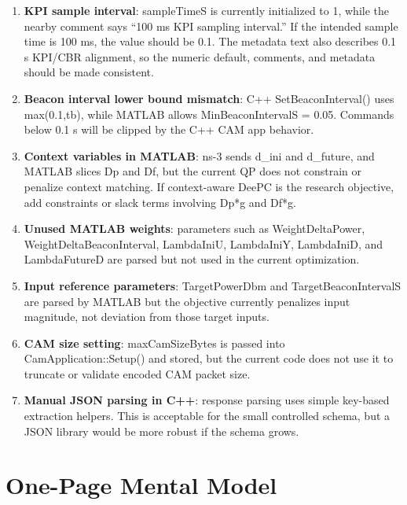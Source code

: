 \documentclass[11pt]{article}
\DeclareRobustCommand{\code}[1]{\texttt{\detokenize{#1}}}
\def\code#1{#1}%
\begin{document}
\begin{enumerate}
  \item \textbf{KPI sample interval}: \code{sampleTimeS} is currently initialized
  to \code{1}, while the nearby comment says ``100 ms KPI sampling interval.''  If
  the intended sample time is 100 ms, the value should be \code{0.1}.
  The metadata text also describes 0.1 s KPI/CBR alignment, so the numeric
  default, comments, and metadata should be made consistent.
  \item \textbf{Beacon interval lower bound mismatch}: C++ \code{SetBeaconInterval()}
  uses \code{max(0.1,tb)}, while MATLAB allows \code{MinBeaconIntervalS = 0.05}.
  Commands below 0.1 s will be clipped by the C++ CAM app behavior.
  \item \textbf{Context variables in MATLAB}: ns-3 sends \code{d_ini} and
  \code{d_future}, and MATLAB slices \code{Dp} and \code{Df}, but the current QP
  does not constrain or penalize context matching.  If context-aware DeePC is the
  research objective, add constraints or slack terms involving \code{Dp*g} and
  \code{Df*g}.
  \item \textbf{Unused MATLAB weights}: parameters such as \code{WeightDeltaPower},
  \code{WeightDeltaBeaconInterval}, \code{LambdaIniU}, \code{LambdaIniY},
  \code{LambdaIniD}, and \code{LambdaFutureD} are parsed but not used in the
  current optimization.
  \item \textbf{Input reference parameters}: \code{TargetPowerDbm} and
  \code{TargetBeaconIntervalS} are parsed by MATLAB but the objective currently
  penalizes input magnitude, not deviation from those target inputs.
  \item \textbf{CAM size setting}: \code{maxCamSizeBytes} is passed into
  \code{CamApplication::Setup()} and stored, but the current code does not use it
  to truncate or validate encoded CAM packet size.
  \item \textbf{Manual JSON parsing in C++}: response parsing uses simple
  key-based extraction helpers.  This is acceptable for the small controlled
  schema, but a JSON library would be more robust if the schema grows.
\end{enumerate}

\section{One-Page Mental Model}
\end{document}
